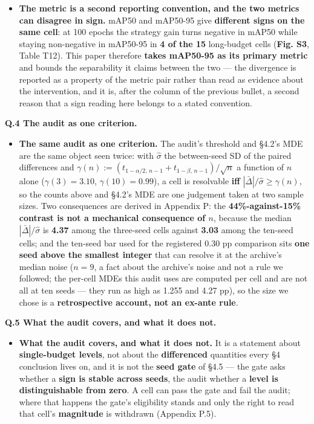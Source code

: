 \documentclass[pdflatex,sn-mathphys-ay]{sn-jnl}
\begin{document}
\begin{itemize}
\item \textbf{The metric is a second reporting convention, and the two metrics can disagree in sign.} mAP50 and mAP50-95 give \textbf{different signs on the same cell}: at 100 epochs the strategy gain turns negative in mAP50 while staying non-negative in mAP50-95 in \textbf{4 of the 15} long-budget cells (\textbf{Fig. S3}, Table T12). This paper therefore \textbf{takes mAP50-95 as its primary metric} and bounds the separability it claims between the two --- the divergence is reported as a property of the metric pair rather than read as evidence about the intervention, and it is, after the column of the previous bullet, a second reason that a sign reading here belongs to a stated convention.
\end{itemize}

\textbf{Q.4 The audit as one criterion.}

\begin{itemize}
\item \textbf{The same audit as one criterion.} The audit's threshold and \S{}4.2's MDE are the same object seen twice: with $\hat\sigma$ the between-seed SD of the paired differences and $\gamma(n) := (t_{1-\alpha/2,\,n-1}+t_{1-\beta,\,n-1})/\sqrt n$ a function of $n$ alone ($\gamma(3) = 3.10$, $\gamma(10) = 0.99$), a cell is resolvable \textbf{iff} $|\bar\Delta|/\hat\sigma \ge \gamma(n)$, so the counts above and \S{}4.2's MDE are one judgement taken at two sample sizes. Two consequences are derived in Appendix P: the \textbf{44\%-against-15\% contrast is not a mechanical consequence of $n$}, because the median $|\bar\Delta|/\hat\sigma$ is \textbf{4.37} among the three-seed cells against \textbf{3.03} among the ten-seed cells; and the ten-seed bar used for the registered 0.30 pp comparison sits \textbf{one seed above the smallest integer} that can resolve it at the archive's median noise ($n=9$, a fact about the archive's noise and not a rule we followed; the per-cell MDEs this audit uses are computed per cell and are not all at ten seeds --- they run as high as 1.255 and 4.27 pp), so the size we chose is a \textbf{retrospective account, not an ex-ante rule}.
\end{itemize}

\textbf{Q.5 What the audit covers, and what it does not.}

\begin{itemize}
\item \textbf{What the audit covers, and what it does not.} It is a statement about \textbf{single-budget levels}, not about the \textbf{differenced} quantities every \S{}4 conclusion lives on, and it is not the \textbf{seed gate} of \S{}4.5 --- the gate asks whether a \textbf{sign is stable across seeds}, the audit whether a \textbf{level is distinguishable from zero}. A cell can pass the gate and fail the audit; where that happens the gate's eligibility stands and only the right to read that cell's \textbf{magnitude} is withdrawn (Appendix P.5).
\end{itemize}
\end{document}
